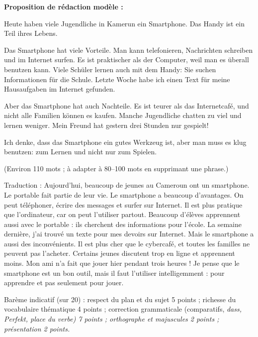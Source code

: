 \documentclass[11pt]{article}
\newcommand{\all}[1]{\ifmmode\text{\textit{#1}}\else\begingroup\selectlanguage{ngerman}\itshape #1\endgroup\fi}
\begin{document}
\begin{corrige}
\textbf{Proposition de rédaction modèle :}

\begin{textebox}
Heute haben viele Jugendliche in Kamerun ein Smartphone. Das Handy ist ein Teil ihres Lebens.

Das Smartphone hat viele Vorteile. Man kann telefonieren, Nachrichten schreiben und im Internet surfen. Es ist praktischer als der Computer, weil man es überall benutzen kann. Viele Schüler lernen auch mit dem Handy: Sie suchen Informationen für die Schule. Letzte Woche habe ich einen Text für meine Hausaufgaben im Internet gefunden.

Aber das Smartphone hat auch Nachteile. Es ist teurer als das Internetcafé, und nicht alle Familien können es kaufen. Manche Jugendliche chatten zu viel und lernen weniger. Mein Freund hat gestern drei Stunden nur gespielt!

Ich denke, dass das Smartphone ein gutes Werkzeug ist, aber man muss es klug benutzen: zum Lernen und nicht nur zum Spielen.
\end{textebox}

(Environ 110 mots ; à adapter à 80--100 mots en supprimant une phrase.)

Traduction : Aujourd'hui, beaucoup de jeunes au Cameroun ont un smartphone. Le portable fait partie de leur vie. Le smartphone a beaucoup d'avantages. On peut téléphoner, écrire des messages et surfer sur Internet. Il est plus pratique que l'ordinateur, car on peut l'utiliser partout. Beaucoup d'élèves apprennent aussi avec le portable : ils cherchent des informations pour l'école. La semaine dernière, j'ai trouvé un texte pour mes devoirs sur Internet. Mais le smartphone a aussi des inconvénients. Il est plus cher que le cybercafé, et toutes les familles ne peuvent pas l'acheter. Certains jeunes discutent trop en ligne et apprennent moins. Mon ami n'a fait que jouer hier pendant trois heures ! Je pense que le smartphone est un bon outil, mais il faut l'utiliser intelligemment : pour apprendre et pas seulement pour jouer.

Barème indicatif (sur 20) : respect du plan et du sujet 5 points ; richesse du vocabulaire thématique 4 points ; correction grammaticale (comparatifs, \all{dass}, \all{Perfekt}, place du verbe) 7 points ; orthographe et majuscules 2 points ; présentation 2 points.


\end{corrige}
\end{document}
